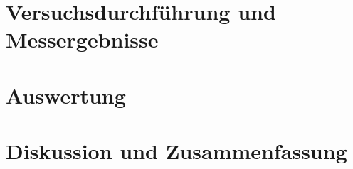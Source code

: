 \documentclass[11pt]{scrartcl}
\begin{document}
\section{Versuchsdurchführung und Messergebnisse}
\label{sec:versuchsdurchfuehrung-messergebnisse}

\section{Auswertung}
\label{sec:auswertung}

\section{Diskussion und Zusammenfassung}
\label{sec:diskussion-zusammenfassung}

\printbibliography

\listoffigures

\listoftables
\end{document}

